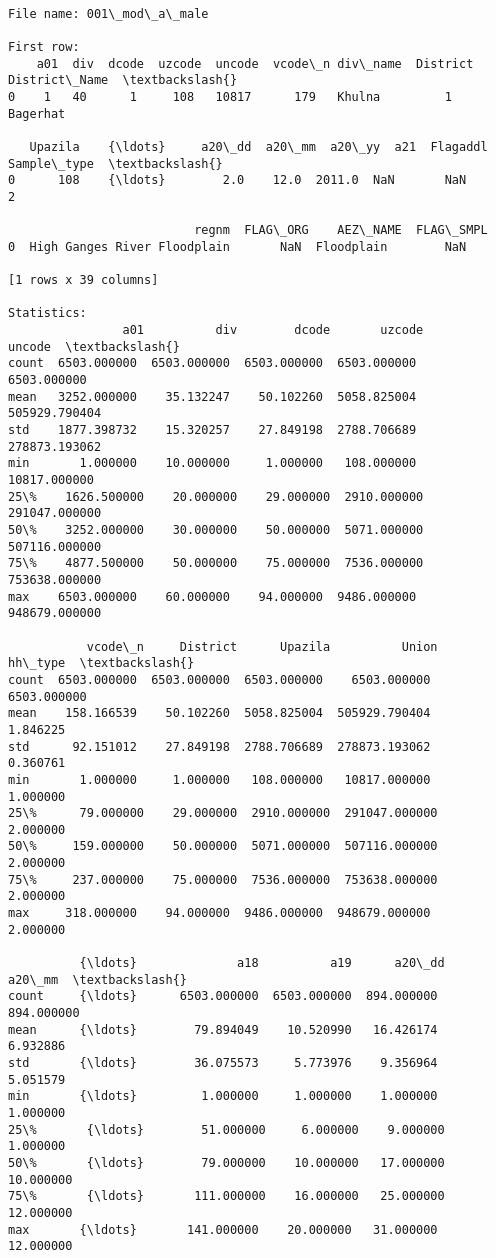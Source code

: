 \documentclass[11pt]{article}
\begin{document}
    \begin{Verbatim}[commandchars=\\\{\}]

File name: 001\_mod\_a\_male

First row: 
    a01  div  dcode  uzcode  uncode  vcode\_n div\_name  District District\_Name  \textbackslash{}
0    1   40      1     108   10817      179   Khulna         1      Bagerhat   

   Upazila    {\ldots}     a20\_dd  a20\_mm  a20\_yy  a21  Flagaddl  Sample\_type  \textbackslash{}
0      108    {\ldots}        2.0    12.0  2011.0  NaN       NaN            2   

                          regnm  FLAG\_ORG    AEZ\_NAME  FLAG\_SMPL  
0  High Ganges River Floodplain       NaN  Floodplain        NaN  

[1 rows x 39 columns]

Statistics: 
                a01          div        dcode       uzcode         uncode  \textbackslash{}
count  6503.000000  6503.000000  6503.000000  6503.000000    6503.000000   
mean   3252.000000    35.132247    50.102260  5058.825004  505929.790404   
std    1877.398732    15.320257    27.849198  2788.706689  278873.193062   
min       1.000000    10.000000     1.000000   108.000000   10817.000000   
25\%    1626.500000    20.000000    29.000000  2910.000000  291047.000000   
50\%    3252.000000    30.000000    50.000000  5071.000000  507116.000000   
75\%    4877.500000    50.000000    75.000000  7536.000000  753638.000000   
max    6503.000000    60.000000    94.000000  9486.000000  948679.000000   

           vcode\_n     District      Upazila          Union      hh\_type  \textbackslash{}
count  6503.000000  6503.000000  6503.000000    6503.000000  6503.000000   
mean    158.166539    50.102260  5058.825004  505929.790404     1.846225   
std      92.151012    27.849198  2788.706689  278873.193062     0.360761   
min       1.000000     1.000000   108.000000   10817.000000     1.000000   
25\%      79.000000    29.000000  2910.000000  291047.000000     2.000000   
50\%     159.000000    50.000000  5071.000000  507116.000000     2.000000   
75\%     237.000000    75.000000  7536.000000  753638.000000     2.000000   
max     318.000000    94.000000  9486.000000  948679.000000     2.000000   

          {\ldots}              a18          a19      a20\_dd      a20\_mm  \textbackslash{}
count     {\ldots}      6503.000000  6503.000000  894.000000  894.000000   
mean      {\ldots}        79.894049    10.520990   16.426174    6.932886   
std       {\ldots}        36.075573     5.773976    9.356964    5.051579   
min       {\ldots}         1.000000     1.000000    1.000000    1.000000   
25\%       {\ldots}        51.000000     6.000000    9.000000    1.000000   
50\%       {\ldots}        79.000000    10.000000   17.000000   10.000000   
75\%       {\ldots}       111.000000    16.000000   25.000000   12.000000   
max       {\ldots}       141.000000    20.000000   31.000000   12.000000   


\end{Verbatim}
\end{document}
